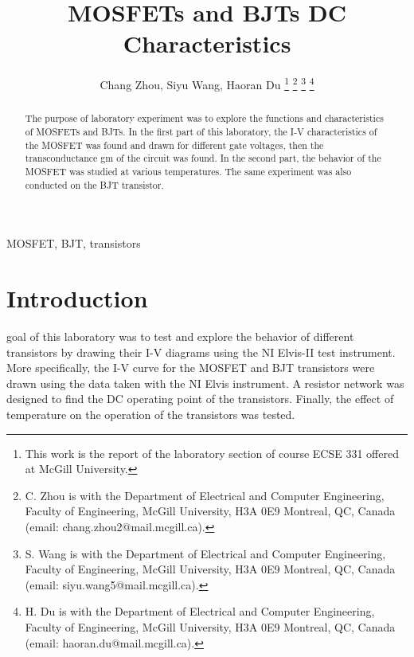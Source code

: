 \documentclass[journal]{IEEEtran}
\begin{document}
\begin{titlepage}

\end{titlepage}
\title{MOSFETs and BJTs DC Characteristics}
\author{Chang Zhou, Siyu Wang, Haoran Du
\thanks{This work is the report of the laboratory section of course ECSE 331 offered at McGill University.}
\thanks{C. Zhou is with the Department of Electrical and Computer
Engineering, Faculty of Engineering, McGill University, H3A 0E9 Montreal, QC, Canada
(email: chang.zhou2@mail.mcgill.ca).}
\thanks{S. Wang is with the Department of Electrical and Computer
Engineering, Faculty of Engineering, McGill University, H3A 0E9 Montreal, QC, Canada
(email: siyu.wang5@mail.mcgill.ca).}
\thanks{H. Du is with the Department of Electrical and Computer
Engineering, Faculty of Engineering, McGill University, H3A 0E9 Montreal, QC, Canada
(email: haoran.du@mail.mcgill.ca).}}

\maketitle

\begin{abstract}
  The purpose of laboratory experiment was to explore the functions
  and characteristics of MOSFETs and BJTs. In the first part of this laboratory,
  the I-V characteristics of the MOSFET was found and drawn for different gate voltages,
  then the transconductance gm of the circuit was found. In the second part,
  the behavior of the MOSFET was studied at various temperatures.
  The same experiment was also conducted on the BJT transistor.
\end{abstract}

\begin{IEEEkeywords}
  MOSFET, BJT, transistors
\end{IEEEkeywords}

\section{Introduction}

 goal of this laboratory was to test and explore the behavior of
 different transistors by drawing their I-V diagrams using the NI Elvis-II test instrument.
 More specifically, the I-V curve for the MOSFET and BJT transistors were drawn
 using the data taken with the NI Elvis instrument. A resistor network was designed
 to find the DC operating point of the transistors.
 Finally, the effect of temperature on the operation of the transistors was tested.
\end{document}
